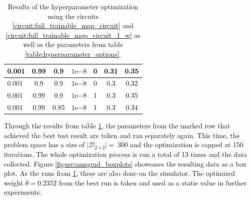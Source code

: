 \begin{table}[]
\begin{tabular}{lcccc|cc|}
\multicolumn{1}{|l|}{0.001}                         & \multicolumn{1}{c|}{0.99}                        & \multicolumn{1}{c|}{0.9}                          & \multicolumn{1}{c|}{$1\mathrm{e}{-8}$}                         & 0       & \multicolumn{1}{c|}{0.31}                         & 0.35    \\ \hline
\multicolumn{1}{|l|}{0.001}                         & \multicolumn{1}{c|}{0.9}                         & \multicolumn{1}{c|}{0.9}                          & \multicolumn{1}{c|}{$1\mathrm{e}{-8}$}                         & 0       & \multicolumn{1}{c|}{0.3}                          & 0.32    \\ \hline
\multicolumn{1}{|l|}{0.001}                         & \multicolumn{1}{c|}{0.99}                        & \multicolumn{1}{c|}{0.9}                          & \multicolumn{1}{c|}{$1\mathrm{e}{-8}$}                         & 1       & \multicolumn{1}{c|}{0.3}                          & 0.35    \\ \hline
\multicolumn{1}{|l|}{0.001}                         & \multicolumn{1}{c|}{0.99}                        & \multicolumn{1}{c|}{0.85}                         & \multicolumn{1}{c|}{$1\mathrm{e}{-8}$}                         & 1       & \multicolumn{1}{c|}{0.3}                          & 0.34    \\ \hline
\end{tabular}
    \caption{Results of the hyperparameter optimization using the circuits \ref{circuit:full_trainable_mqp_circuit} and \ref{circuit:full_trainable_mqp_circuit_1_w} as well as the parameters from table \ref{table:hyperparameter_options}.}
    \label{table:hyperparameter_results}
\end{table}

\newpage

Through the results from table \ref{table:hyperparameter_results}, the parameters from the marked row that achieved the best test result are taken and ran separately again. This time, the problem space has a size of $\left|\mathcal{D}_{2\times2}\right| =\ 300$ and the optimization is capped at 150 iterations. The whole optimization process is run a total of 13 times and the data collected. Figure \ref{figure:amsgrad_boxplots} showcases the resulting data as a box plot. As the runs from \ref{table:hyperparameter_results}, these are also done on the simulator. The optimized weight $\theta = 0.2352$ from the best run is taken and used as a static value in further experiments.\par

